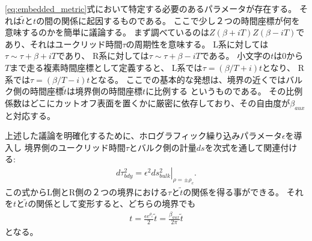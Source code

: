 \eqref{eq:embedded_metric}式において特定する必要のあるパラメータが存在する。
それは$\tilde{t}$と$t$の間の関係に起因するものである。
ここで少し２つの時間座標が何を意味するのかを簡単に議論する。
まず調べているのは$Z(\beta + iT)Z(\beta - iT)$であり、それはユークリッド時間$\tau$の周期性を意味する。
L系に対しては$\tau \sim \tau + \beta + iT$であり、
R系に対しては$\tau \sim \tau + \beta - iT$である。
小文字の$t$は0から$T$まで走る複素時間座標として定義すると、
L系では$\tau = (\beta / T + i)t$となり、
R系では$\tau = (\beta / T - i)t$となる。
ここでの基本的な発想は、境界の近くではバルク側の時間座標$\tilde{t}$は境界側の時間座標$t$に比例する
というものである。
その比例係数はどこにカットオフ表面を置くかに厳密に依存しており、その自由度が$\beta_{aux}$と対応する。

上述した議論を明確化するために、ホログラフィック繰り込みパラメータ$\epsilon$を導入し
境界側のユークリッド時間$\tau$とバルク側の計量$ds$を次式を通して関連付ける:
\begin{align}
	d\tau^2_{bdy} = \left.\epsilon^2ds^2_{bulk}\right|_{\rho = \pm\rho_c}.
\end{align}
この式からL側とR側の２つの境界における$\tau$と$\tilde{t}$の関係を得る事ができる。
それを$t$と$\tilde{t}$の関係として変形すると、どちらの境界でも
\begin{align}
	t = \frac{\epsilon e^{\rho_c}}{2}\tilde{t} = \frac{\beta_{aux}}{2\pi}\tilde{t}
\end{align}
となる。


\pagebreak